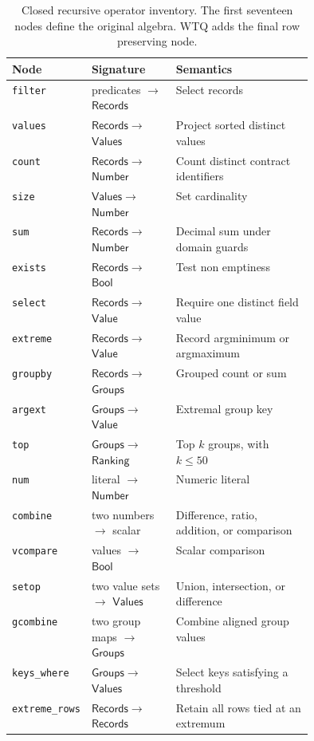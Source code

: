 \documentclass{article}
\newcommand{\records}{\ensuremath{\mathsf{Records}}}
\newcommand{\values}{\ensuremath{\mathsf{Values}}}
\newcommand{\groups}{\ensuremath{\mathsf{Groups}}}
\newcommand{\numbertype}{\ensuremath{\mathsf{Number}}}
\newcommand{\valuetype}{\ensuremath{\mathsf{Value}}}
\newcommand{\booltype}{\ensuremath{\mathsf{Bool}}}
\newcommand{\ranking}{\ensuremath{\mathsf{Ranking}}}
\begin{document}
\begin{table}[h]
  \centering
  \caption{Closed recursive operator inventory.  The first seventeen nodes define the original
  algebra.  WTQ adds the final row preserving node.}
  \label{tab:operators}
  \small
  \begin{tabularx}{\linewidth}{p{0.16\linewidth}p{0.28\linewidth}X}
    \toprule
    Node & Signature & Semantics \\
    \midrule
    \texttt{filter} & predicates $\rightarrow$ \records & Select records \\
    \texttt{values} & \records $\rightarrow$ \values & Project sorted distinct values \\
    \texttt{count} & \records $\rightarrow$ \numbertype & Count distinct contract identifiers \\
    \texttt{size} & \values $\rightarrow$ \numbertype & Set cardinality \\
    \texttt{sum} & \records $\rightarrow$ \numbertype & Decimal sum under domain guards \\
    \texttt{exists} & \records $\rightarrow$ \booltype & Test non emptiness \\
    \texttt{select} & \records $\rightarrow$ \valuetype & Require one distinct field value \\
    \texttt{extreme} & \records $\rightarrow$ \valuetype & Record argminimum or argmaximum \\
    \texttt{groupby} & \records $\rightarrow$ \groups & Grouped count or sum \\
    \texttt{argext} & \groups $\rightarrow$ \valuetype & Extremal group key \\
    \texttt{top} & \groups $\rightarrow$ \ranking & Top $k$ groups, with $k\leq50$ \\
    \texttt{num} & literal $\rightarrow$ \numbertype & Numeric literal \\
    \texttt{combine} & two numbers $\rightarrow$ scalar & Difference, ratio, addition, or comparison \\
    \texttt{vcompare} & values $\rightarrow$ \booltype & Scalar comparison \\
    \texttt{setop} & two value sets $\rightarrow$ \values & Union, intersection, or difference \\
    \texttt{gcombine} & two group maps $\rightarrow$ \groups & Combine aligned group values \\
    \texttt{keys\_where} & \groups $\rightarrow$ \values & Select keys satisfying a threshold \\
    \texttt{extreme\_rows} & \records $\rightarrow$ \records & Retain all rows tied at an extremum \\
    \bottomrule
  \end{tabularx}
\end{table}
\end{document}
